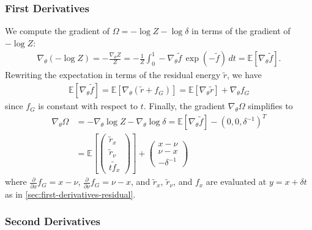 \documentclass{article}
\begin{document}
\subsubsection{First Derivatives}\label{sec:qrician-first-derivatives}

We compute the gradient of $\Omega = -\log Z - \log\delta$ in terms of the gradient of $-\log Z$:
%
\begin{align}
  \nabla_{\theta} (-\log Z) = -\frac{\nabla_{\theta} Z}{Z} = -\frac{1}{Z}\int_0^1 -\nabla_{\theta} \tilde{f} \, \exp(-\tilde{f}) \, dt = \mathbb{E}[\nabla_{\theta} \tilde{f}].
\end{align}
%
Rewriting the expectation in terms of the residual energy $\tilde{r}$, we have
%
\begin{align}
  \mathbb{E}[\nabla_{\theta} \tilde{f}] = \mathbb{E}[\nabla_{\theta} (\tilde{r} + f_G)] = \mathbb{E}[\nabla_{\theta} \tilde{r}] + \nabla_{\theta} f_G
\end{align}
%
since $f_G$ is constant with respect to $t$.
Finally, the gradient $\nabla_{\theta} \Omega$ simplifies to
%
\begin{align}
  \nabla_{\theta} \Omega & = - \nabla_\theta \log Z - \nabla_\theta \log\delta = \mathbb{E}[\nabla_{\theta} \tilde{f}] - (0, 0, \delta^{-1})^T \\
                         & = \mathbb{E}\left[ \begin{pmatrix} \tilde{r}_x \\ \tilde{r}_\nu \\ t \tilde{f}_x \end{pmatrix} \right]
  + \begin{pmatrix} x - \nu \\ \nu - x \\ -\delta^{-1} \end{pmatrix}
\end{align}
%
where $\frac{\partial}{\partial x} f_G = x - \nu$, $\frac{\partial}{\partial \nu} f_G = \nu - x$, and $\tilde{r}_x$, $\tilde{r}_\nu$, and $f_x$ are evaluated at $y=x + \delta t$ as in \cref{sec:first-derivatives-residual}.

\subsubsection{Second Derivatives}\label{sec:qrician-second-derivatives}
\end{document}

